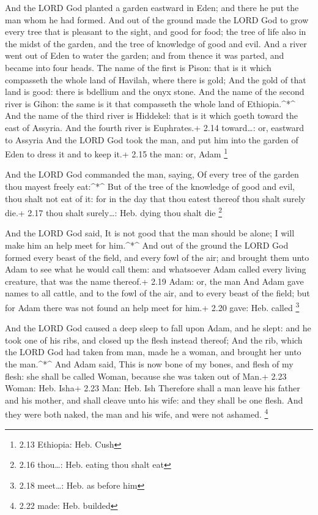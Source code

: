  And the LORD God planted a garden eastward in Eden; and
there he put the man whom he had formed.  And out of the
ground made the LORD God to grow every tree that is pleasant to the
sight, and good for food; the tree of life also in the midst of the
garden, and the tree of knowledge of good and evil.  And a
river went out of Eden to water the garden; and from thence it was
parted, and became into four heads.  The name of the first
is Pison: that is it which compasseth the whole land of Havilah, where
there is gold;  And the gold of that land is good: there is
bdellium and the onyx stone.  And the name of the second
river is Gihon: the same is it that compasseth the whole land of
Ethiopia.\^{}*\^{}  And the name of the third river is
Hiddekel: that is it which goeth toward the east of Assyria. And the
fourth river is Euphrates.+ 2.14 toward\ldots: or, eastward to Assyria
 And the LORD God took the man, and put him into the garden
of Eden to dress it and to keep it.+ 2.15 the man: or, Adam \footnote{2.13
  Ethiopia: Heb. Cush}

 And the LORD God commanded the man, saying, Of every tree
of the garden thou mayest freely eat:\^{}*\^{}  But of the
tree of the knowledge of good and evil, thou shalt not eat of it: for in
the day that thou eatest thereof thou shalt surely die.+ 2.17 thou shalt
surely\ldots: Heb. dying thou shalt die \footnote{2.16 thou\ldots: Heb.
  eating thou shalt eat}

 And the LORD God said, It is not good that the man should
be alone; I will make him an help meet for him.\^{}*\^{} 
And out of the ground the LORD God formed every beast of the field, and
every fowl of the air; and brought them unto Adam to see what he would
call them: and whatsoever Adam called every living creature, that was
the name thereof.+ 2.19 Adam: or, the man  And Adam gave
names to all cattle, and to the fowl of the air, and to every beast of
the field; but for Adam there was not found an help meet for him.+ 2.20
gave: Heb. called \footnote{2.18 meet\ldots: Heb. as before him}

 And the LORD God caused a deep sleep to fall upon Adam,
and he slept: and he took one of his ribs, and closed up the flesh
instead thereof;  And the rib, which the LORD God had taken
from man, made he a woman, and brought her unto the man.\^{}*\^{}
 And Adam said, This is now bone of my bones, and flesh of
my flesh: she shall be called Woman, because she was taken out of Man.+
2.23 Woman: Heb. Isha+ 2.23 Man: Heb. Ish  Therefore shall
a man leave his father and his mother, and shall cleave unto his wife:
and they shall be one flesh.  And they were both naked, the
man and his wife, and were not ashamed. \footnote{2.22 made: Heb.
  builded}

